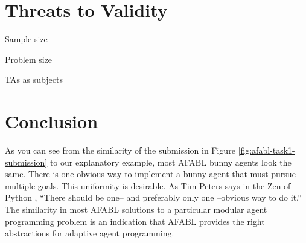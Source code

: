 \section{Threats to Validity}

Sample size

Problem size

TAs as subjects

\section{Conclusion}

As you can see from the similarity of the submission in Figure \ref{fig:afabl-task1-submission} to our explanatory example, most AFABL bunny agents look the same. There is one obvious way to implement a bunny agent that must pursue multiple goals. This uniformity is desirable. As Tim Peters says in the Zen of Python \cite{peters2004zen}, ``There should be one-- and preferably only one --obvious way to do it.'' The similarity in most AFABL solutions to a particular modular agent programming problem is an indication that AFABL provides the right abstractions for adaptive agent programming.
